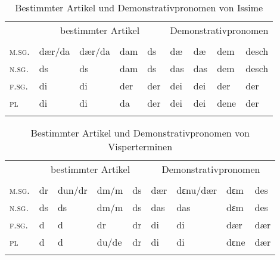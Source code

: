 
\begin{table}[H]
	\caption{Bestimmter Artikel und Demonstrativpronomen von Issime \citep[4-12, 81]{Perinetto1981}}\label{table84}
	\begin{tabular}{lllllllll}
		\lsptoprule
		& \multicolumn{4}{c}{bestimmter Artikel} &  \multicolumn{4}{c}{Demonstrativpronomen} \\\cmidrule(lr){2-5}\cmidrule(lr){6-9}
		& \NOM & \AKK & \DAT & \GEN & \NOM & \AKK & \DAT & \GEN\\\midrule
		\textsc{m.sg.} & dær/da & dær/da & dam & ds & dæ & dæ & dem & desch\\
		\textsc{n.sg.} & ds & ds & dam & ds & das & das & dem & desch\\
		\textsc{f.sg.} & di & di & der & der & dei & dei & der & der\\
		\textsc{pl} & di & di & da & der & dei & dei & dene & der\\
		\lspbottomrule
	\end{tabular}
\end{table}


\begin{table}[H]
	\caption{Bestimmter Artikel und Demonstrativpronomen von Visperterminen \citep[141]{Wipf1911}}\label{table85}
	\begin{tabular}{lllllllll}
		\lsptoprule
		& \multicolumn{4}{c}{bestimmter Artikel} &  \multicolumn{4}{c}{Demonstrativpronomen} \\\cmidrule(lr){2-5}\cmidrule(lr){6-9}
		& \NOM & \AKK & \DAT & \GEN & \NOM & \AKK & \DAT & \GEN\\\midrule
		\textsc{m.sg.} & dr & dun/dr & dm/m & ds & dær & dɛnu/dær & dɛm & des\\
		\textsc{n.sg.} & ds & ds & dm/m & ds & das & das & dɛm & des\\
		\textsc{f.sg.} & d & d & dr & dr & di & di & dær & dær\\
		\textsc{pl} & d & d & du/de & dr & di & di & dɛne & dær\\
		\lspbottomrule
	\end{tabular}
\end{table}


